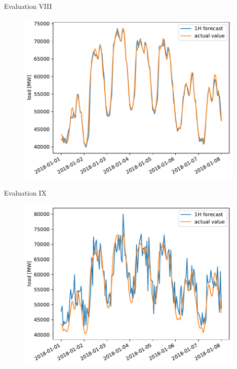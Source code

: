 \documentclass[t,xcolor={table},fleqn]{beamer}
\begin{document}
\begin{frame}{Evaluation VIII}


\begin{figure}[h!]%
\centering
\includegraphics[height=\textheight]{../doc/plots/ARMAXfc/ARMAX_p2q2_data2015to2017_fcto2018123100_load_lag_plot_range2018010100_2018010800}%
\end{figure}%

\end{frame}


\begin{frame}{Evaluation IX}


\begin{figure}[h!]%
\centering
\includegraphics[height=\textheight]{../doc/plots/ARMAXfc/ARMAX_p1q0_data2017010100to2017123100_fc2017123101to2018010800_t2m_all}%
\end{figure}%

\end{frame}
\end{document}
